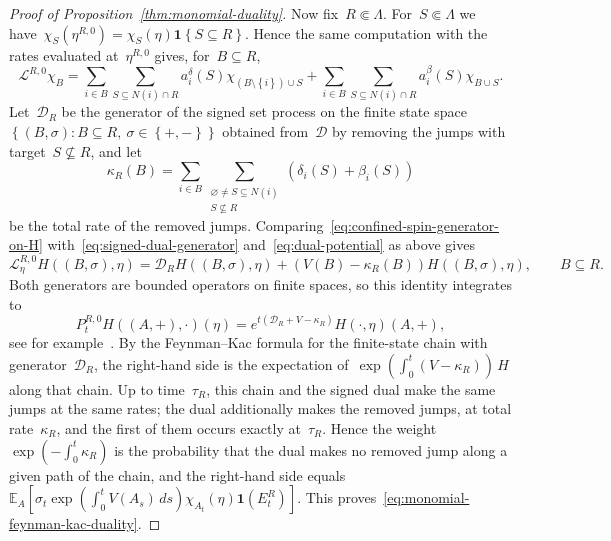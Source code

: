 \documentclass[EJP,preprint,NODS,nobera]{ejpecp}
\newcommand{\E}{\mathbb{E}}
\newcommand{\bb}[1]{\left(#1\right)}
\newcommand{\Cb}[1]{\left[#1\right]}
\newcommand{\cb}[1]{\left\{#1\right\}}
\newcommand{\ind}{\mathbf{1}}
\newcommand{\Lcal}{\mathcal{L}}
\newcommand{\Dcal}{\mathcal{D}}
\newcommand{\chg}[1]{{\color{changegreen}#1}}
\begin{document}
\begin{proof}[Proof of Proposition~\ref{thm:monomial-duality}]
\chg{Now fix~$R\Subset\Lambda$. For~$S\Subset\Lambda$ we
have~$\chi_S(\eta^{R,0})=\chi_S(\eta)\ind\cb{S\subseteq R}$. Hence the same
computation with the rates evaluated at~$\eta^{R,0}$ gives, for~$B\subseteq R$,}
\begin{equation}
\label{eq:confined-spin-generator-on-H}
\Lcal^{R,0}\chi_B
=
\sum_{i\in B}
\sum_{S\subseteq N(i)\cap R}
a_i^\delta(S)
\chi_{\bb{B\setminus\cb{i}}\cup S}
+
\sum_{i\in B}
\sum_{S\subseteq N(i)\cap R}
a_i^\beta(S)
\chi_{B\cup S}.
\end{equation}
\chg{Let~$\Dcal_R$ be the generator of the signed set process on the finite
state space~$\cb{(B,\sigma):B\subseteq R,\ \sigma\in\cb{+,-}}$ obtained
from~$\Dcal$ by removing the jumps with target~$S\nsubseteq R$, and let}
\begin{equation*}
\kappa_R(B)
=
\sum_{i\in B}
\sum_{\substack{\varnothing\neq S\subseteq N(i)\\S\nsubseteq R}}
\bb{\delta_i(S)+\beta_i(S)}
\end{equation*}
\chg{be the total rate of the removed jumps. Comparing~\eqref{eq:confined-spin-generator-on-H}
with~\eqref{eq:signed-dual-generator} and~\eqref{eq:dual-potential} as above gives}
\begin{equation}
\label{eq:confined-generator-duality}
\Lcal_\eta^{R,0}H((B,\sigma),\eta)
=
\Dcal_RH((B,\sigma),\eta)
+
\bb{V(B)-\kappa_R(B)}H((B,\sigma),\eta),
\qquad B\subseteq R.
\end{equation}
\chg{Both generators are bounded operators on finite spaces, so this identity
integrates to}
\begin{equation*}
P_t^{R,0}H((A,+),\cdot)(\eta)
=
e^{t\bb{\Dcal_R+V-\kappa_R}}H(\cdot,\eta)(A,+),
\end{equation*}
\chg{see for example~\cite{JansenKurt2014}. By the Feynman--Kac formula for the
finite-state chain with generator~$\Dcal_R$, the right-hand side is the
expectation of~$\exp\bb{\int_0^t(V-\kappa_R)}\,H$ along that chain. Up to
time~$\tau_R$, this chain and the signed dual make the same jumps at the same
rates; the dual additionally makes the removed jumps, at total
rate~$\kappa_R$, and the first of them occurs exactly at~$\tau_R$. Hence the
weight~$\exp\bb{-\int_0^t\kappa_R}$ is the probability that the dual makes no
removed jump along a given path of the chain, and the right-hand side
equals~$\E_A\Cb{\sigma_t\exp\bb{\int_0^tV(A_s)\,ds}\chi_{A_t}(\eta)\ind\bb{E_t^R}}$.
This proves~\eqref{eq:monomial-feynman-kac-duality}.}
\end{proof}
\end{document}
